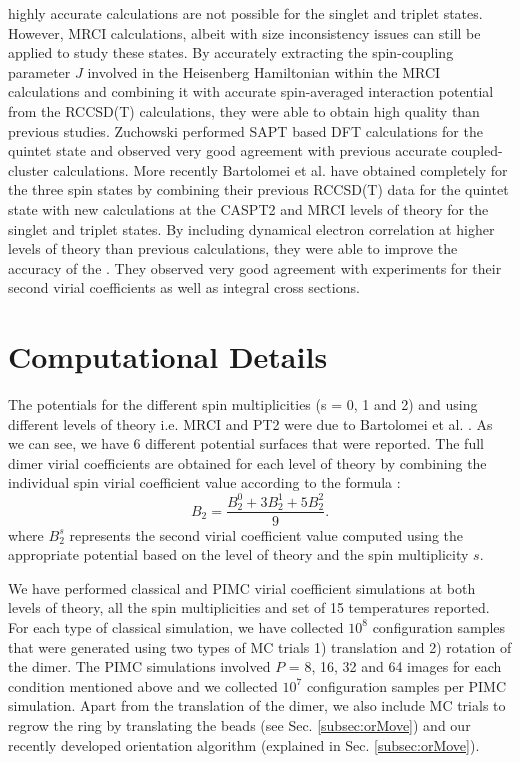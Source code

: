 highly accurate calculations are not possible for the singlet and triplet states. However, MRCI calculations, albeit with size inconsistency issues can still be applied to study these states. By accurately extracting the spin-coupling parameter $J$ involved in the Heisenberg Hamiltonian within the MRCI calculations and combining it with accurate spin-averaged interaction potential from the RCCSD(T) calculations, they were able to obtain high quality \PESs{} than previous studies. Zuchowski \cite{Zuchowski2008} performed SAPT based DFT calculations for the quintet state and observed very good agreement with previous accurate \abinitio{} coupled-cluster calculations. More recently Bartolomei et al. \cite{Bartolomei2010} have obtained completely \abinitio{} \PESs{} for the three spin states by combining their previous RCCSD(T) data \cite{Bartolomei2008} for the quintet state with new \abinitio{} calculations at the CASPT2 and MRCI levels of theory for the singlet and triplet states. By including dynamical electron correlation at higher levels of theory than previous calculations, they were able to improve the accuracy of the \PESs{}. They observed very good agreement with experiments for their second virial coefficients as well as integral cross sections.
\section{Computational Details}
    The \abinitio{} potentials for the different spin multiplicities (s = 0, 1 and 2) and using different levels of theory i.e. MRCI and PT2 were due to Bartolomei et al. \cite{Bartolomei2010}. As we can see, we have 6 different potential surfaces that were reported. The full dimer virial coefficients are obtained for each level of theory by combining the individual spin virial coefficient value according to the formula \cite{Aquilanti1999,Bartolomei2010}:
    \begin{equation}
        \label{eq:o2combination}
        B_2 = \frac{B_2^0 + 3 B_2^1 + 5 B_2^2}{9}.
    \end{equation}
    where $B_2^s$ represents the second virial coefficient value computed using the appropriate potential based on the level of theory and the spin multiplicity $s$.

    We have performed classical and PIMC virial coefficient simulations at both levels of theory, all the spin multiplicities and set of 15 temperatures reported. For each type of classical simulation, we have collected $10^8$ configuration samples that were generated using two types of MC trials 1) translation and 2) rotation of the dimer. The PIMC simulations involved $P$ = 8, 16, 32 and 64 images for each condition mentioned above and we collected $10^7$ configuration samples per PIMC simulation. Apart from the translation of the dimer, we also include MC trials to regrow the ring by translating the beads (see Sec. \ref{subsec:orMove}) and our recently developed orientation algorithm \cite{hydrogen} (explained in Sec. \ref{subsec:orMove}).


